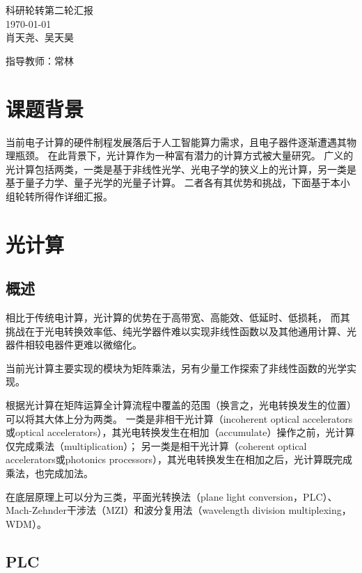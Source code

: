 \documentclass[hyperref, fntef, fancyhdr,zihao = -4,UTF8]{ctexart}
\begin{document}
\begingroup  
    \centering
    \LARGE 科研轮转第二轮汇报\\
    \large \today\\[0.5em]
    肖天尧、吴天昊\par
    指导教师：常林\par
\endgroup

\section{课题背景}

当前电子计算的硬件制程发展落后于人工智能算力需求，且电子器件逐渐遭遇其物理瓶颈。
在此背景下，光计算作为一种富有潜力的计算方式被大量研究。
广义的光计算包括两类，一类是基于非线性光学、光电子学的狭义上的光计算，另一类是基于量子力学、量子光学的光量子计算。
二者各有其优势和挑战，下面基于本小组轮转所得作详细汇报。

\section{光计算}

\subsection{概述}

相比于传统电计算，光计算的优势在于高带宽、高能效、低延时、低损耗，
而其挑战在于光电转换效率低、纯光学器件难以实现非线性函数以及其他通用计算、光器件相较电器件更难以微缩化。

当前光计算主要实现的模块为矩阵乘法，另有少量工作探索了非线性函数的光学实现。

根据光计算在矩阵运算全计算流程中覆盖的范围（换言之，光电转换发生的位置）可以将其大体上分为两类。
一类是非相干光计算（incoherent optical accelerators或optical accelerators），其光电转换发生在相加（accumulate）操作之前，光计算仅完成乘法（multiplication）；
另一类是相干光计算（coherent optical accelerators或photonics processors），其光电转换发生在相加之后，光计算既完成乘法，也完成加法。\cite{CoherentIncoherentIntegratedPhotonicNeuromorphic2024}

在底层原理上可以分为三类，平面光转换法（plane light conversion，PLC）、Mach-Zehnder干涉法（MZI）和波分复用法（wavelength division multiplexing，WDM）。\cite{PhotonicMatrixMultiplication2022}

\subsection{PLC}
\end{document}
